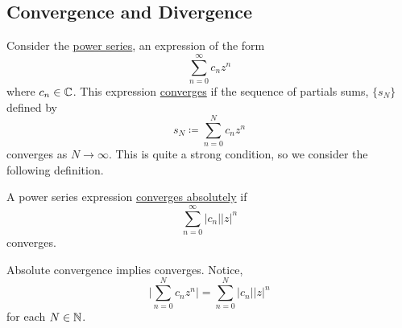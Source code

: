 \documentclass[11pt]{article}
\begin{document}
\subsection{Convergence and Divergence}
\begin{example}
	Consider the \underline{power series}, an expression of the form
	\begin{equation*}
		\sum^\infty_{n=0} c_nz^n
	\end{equation*}
	where $c_n \in \mathbb{C}$. This expression \underline{converges} if the sequence of
	partials sums, $\{s_N\}$ defined by
	\begin{equation*}
		s_N \coloneqq \sum^N_{n=0} c_nz^n
	\end{equation*}
	converges as $N \to \infty$. This is quite a strong condition, so we
	consider the following definition.
\end{example}
\begin{definition}
	A power series expression \underline{converges absolutely} if
	\begin{equation*}
		\sum^{\infty}_{n=0} |c_n||z|^n
	\end{equation*}
	converges.
\end{definition}
\begin{remark}
	Absolute convergence implies converges. Notice,
	\begin{equation*}
		\bigg| \sum_{n=0}^N c_n z^n \bigg| = \sum^N_{n=0} |c_n||z|^n
	\end{equation*}
	for each $N \in \mathbb{N}$.
\end{remark}
\end{document}
